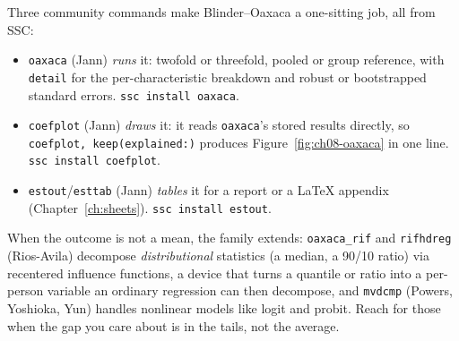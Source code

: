 \begin{kaobox}[frametitle={SSC toolkit: running, interpreting, and drawing a decomposition}]
Three community commands make Blinder--Oaxaca a one-sitting job, all from SSC:
\begin{itemize}
    \item \texttt{oaxaca} (Jann) \emph{runs} it: twofold or threefold, pooled or group reference, with \texttt{detail} for the per-characteristic breakdown and robust or bootstrapped standard errors. \texttt{ssc install oaxaca}.
    \item \texttt{coefplot} (Jann) \emph{draws} it: it reads \texttt{oaxaca}'s stored results directly, so \texttt{coefplot, keep(explained:)} produces Figure~\ref{fig:ch08-oaxaca} in one line. \texttt{ssc install coefplot}.
    \item \texttt{estout}/\texttt{esttab} (Jann) \emph{tables} it for a report or a \LaTeX{} appendix (Chapter~\ref{ch:sheets}). \texttt{ssc install estout}.
\end{itemize}
When the outcome is not a mean, the family extends: \texttt{oaxaca\_rif} and \texttt{rifhdreg} (Rios-Avila) decompose \emph{distributional} statistics (a median, a 90/10 ratio) via recentered influence functions, a device that turns a quantile or ratio into a per-person variable an ordinary regression can then decompose, and \texttt{mvdcmp} (Powers, Yoshioka, Yun) handles nonlinear models like logit and probit. Reach for those when the gap you care about is in the tails, not the average.
\end{kaobox}

